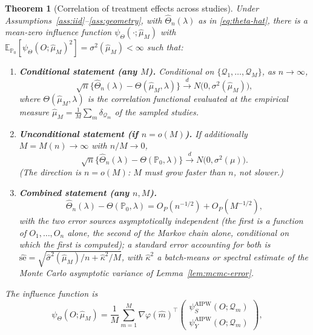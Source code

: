 \documentclass[11pt]{article}
\theoremstyle{plain}
\newtheorem{theorem}{Theorem}[section]
\theoremstyle{definition}
\theoremstyle{remark}
\newcommand{\E}{\mathbb{E}}
\newcommand{\PP}{\mathbb{P}}
\newcommand{\Q}{\mathcal{Q}}
\newcommand{\Qhat}{\widehat{\mu}_M}
\newcommand{\Thetahat}{\widehat{\Theta}}
\begin{document}
\begin{theorem}[Correlation of treatment effects across studies]\label{thm:main}
Under Assumptions~\ref{ass:iid}--\ref{ass:geometry}, with $\Thetahat_n(\lambda)$ as in
\eqref{eq:theta-hat}, there is a mean-zero influence function
$\psi_\Theta(\cdot;\Qhat)$ with $\E_{\PP_0}[\psi_\Theta(O;\Qhat)^2]=\sigma^2(\Qhat)<\infty$
such that:
\begin{enumerate}[label=(\alph*)]
    \item \textbf{Conditional statement (any $M$).} Conditional on
    $\{\Q_1,\dots,\Q_M\}$, as $n\to\infty$,
    \begin{equation}\label{eq:thm-main-conditional}
        \sqrt n\{\Thetahat_n(\lambda) - \Theta(\Qhat,\lambda)\}
        \xrightarrow{d} N\big(0,\sigma^2(\Qhat)\big),
    \end{equation}
    where $\Theta(\Qhat,\lambda)$ is the correlation functional evaluated at the
    empirical measure $\Qhat=\frac1M\sum_m\delta_{\Q_m}$ of the sampled studies.
    \item \textbf{Unconditional statement (if $n=o(M)$).} If additionally $M=M(n)\to\infty$
    with $n/M\to0$,
    \begin{equation}\label{eq:thm-main-unconditional}
        \sqrt n\{\Thetahat_n(\lambda) - \Theta(\PP_0,\lambda)\}
        \xrightarrow{d} N\big(0,\sigma^2(\mu)\big).
    \end{equation}
    (The direction is $n=o(M)$: $M$ must grow \emph{faster} than $n$, not slower.)
    \item \textbf{Combined statement (any $n,M$).}
    \begin{equation}\label{eq:thm-main-combined}
        \Thetahat_n(\lambda) - \Theta(\PP_0,\lambda) = O_P(n^{-1/2}) + O_P(M^{-1/2}),
    \end{equation}
    with the two error sources asymptotically independent (the first is a function of
    $O_1,\dots,O_n$ alone, the second of the Markov chain alone, conditional on which
    the first is computed); a standard error accounting for both is
    $\widehat{\mathrm{se}} = \sqrt{\hat\sigma^2(\Qhat)/n + \hat\kappa^2/M}$, with
    $\hat\kappa^2$ a batch-means or spectral estimate of the Monte Carlo asymptotic
    variance of Lemma~\ref{lem:mcmc-error}.
\end{enumerate}
The influence function is
\begin{equation}\label{eq:psi-theta-layer1}
    \psi_\Theta(O;\Qhat) = \frac1M\sum_{m=1}^M \nabla\varphi(\hat m)^\top
    \begin{pmatrix}\psi_S^{\mathrm{AIPW}}(O;\Q_m)\\ \psi_Y^{\mathrm{AIPW}}(O;\Q_m)\end{pmatrix},

\end{equation}
\end{theorem}
\end{document}
